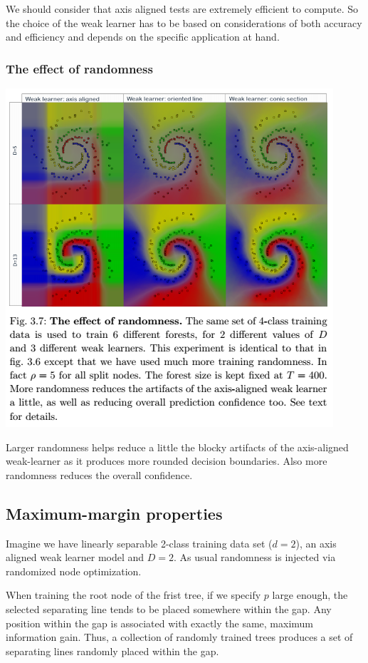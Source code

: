 \documentclass{scrartcl}
\begin{document}
\begin{appendices}
We should consider that axis aligned tests are extremely efficient to compute. So the choice of the weak learner has to be based on considerations of both accuracy and efficiency and depends on the specific application at hand.

\subsubsection{The effect of randomness}

\begin{center}
    \includegraphics[scale=1]{img/forestrandom}
\end{center}

Larger randomness helps reduce a little the blocky artifacts of the axis-aligned weak-learner as it produces more rounded decision boundaries. Also more randomness reduces the overall confidence.

\subsection{Maximum-margin properties}
Imagine we have linearly separable 2-class training data set (\(d=2\)), an axis aligned weak learner model and \(D=2\). As usual randomness is injected via randomized node optimization.

When training the root node of the frist tree, if we specify \(p\) large enough, the selected separating line tends to be placed somewhere within the gap. Any position within the gap is associated with exactly the same, maximum information gain. Thus, a collection of randomly trained trees produces a set of separating lines randomly placed within the gap.


\end{appendices}
\end{document}
